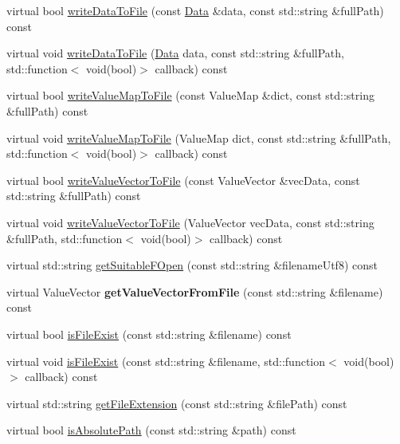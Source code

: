 \begin{DoxyCompactItemize}
virtual bool \hyperlink{classFileUtils_a8b88ed03982d6aec3008baba5345f323}{write\+Data\+To\+File} (const \hyperlink{classData}{Data} \&data, const std\+::string \&full\+Path) const
\item 
virtual void \hyperlink{classFileUtils_a5c32f11d009af2cab29b9f0fcb20b43a}{write\+Data\+To\+File} (\hyperlink{classData}{Data} data, const std\+::string \&full\+Path, std\+::function$<$ void(bool)$>$ callback) const
\item 
virtual bool \hyperlink{classFileUtils_a19a124d3a50e5dcd1f4d93eb4799af6e}{write\+Value\+Map\+To\+File} (const Value\+Map \&dict, const std\+::string \&full\+Path) const
\item 
virtual void \hyperlink{classFileUtils_a8efadc41f2a123969a3bd9ee5ae35ec9}{write\+Value\+Map\+To\+File} (Value\+Map dict, const std\+::string \&full\+Path, std\+::function$<$ void(bool)$>$ callback) const
\item 
virtual bool \hyperlink{classFileUtils_a05afdedbbee8528bf4237b833789349e}{write\+Value\+Vector\+To\+File} (const Value\+Vector \&vec\+Data, const std\+::string \&full\+Path) const
\item 
virtual void \hyperlink{classFileUtils_a13c34d3019012ab99be6e04ff199d643}{write\+Value\+Vector\+To\+File} (Value\+Vector vec\+Data, const std\+::string \&full\+Path, std\+::function$<$ void(bool)$>$ callback) const
\item 
virtual std\+::string \hyperlink{classFileUtils_ab4cf90cd6dd8c8ba0b6b37b53bbd3ae8}{get\+Suitable\+F\+Open} (const std\+::string \&filename\+Utf8) const
\item 
\mbox{\label{classFileUtils_a753415e0272a155b60097abe241d0fb7}} 
virtual Value\+Vector {\bfseries get\+Value\+Vector\+From\+File} (const std\+::string \&filename) const
\item 
virtual bool \hyperlink{classFileUtils_a53eb44abd5db36aeb91ef29174077c8f}{is\+File\+Exist} (const std\+::string \&filename) const
\item 
virtual void \hyperlink{classFileUtils_ad681db9f60c32e3aacbebacaf6a316a8}{is\+File\+Exist} (const std\+::string \&filename, std\+::function$<$ void(bool)$>$ callback) const
\item 
virtual std\+::string \hyperlink{classFileUtils_ad43573c4c3aa6af62616105cf8435668}{get\+File\+Extension} (const std\+::string \&file\+Path) const
\item 
virtual bool \hyperlink{classFileUtils_a1c8144d857ca750585e585b53f6b5d7f}{is\+Absolute\+Path} (const std\+::string \&path) const

\end{DoxyCompactItemize}
